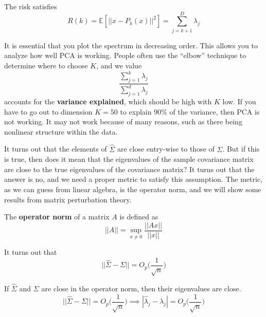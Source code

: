     \begin{theorem}[Risk]
      The risk satisfies 
      \begin{equation}
        R(k) = \mathbb{E}[|| x - P_k (x) ||^2 ] = \sum_{j=k+1}^D \lambda_j 
      \end{equation}
    \end{theorem}

    It is essential that you plot the spectrum in decreasing order. This allows you to analyze how well PCA is working. People often use the ``elbow'' technique to determine where to choose $K$, and we value 
    \begin{equation}
      \frac{\sum_{j=1}^k \lambda_j}{\sum_{j=1}^d \lambda_j} 
    \end{equation}
    accounts for the \textbf{variance explained}, which should be high with $K$ low. If you have to go out to dimension $K=50$ to explain $90\%$ of the variance, then PCA is not working. It may not work because of many reasons, such as there being nonlinear structure within the data. 

    It turns out that the elements of $\hat{\Sigma}$ are close entry-wise to those of $\Sigma$. But if this is true, then does it mean that the eigenvalues of the sample covariance matrix are close to the true eigenvalues of the covariance matrix? It turns out that the answer is no, and we need a proper metric to satisfy this assumption. The metric, as we can guess from linear algebra, is the operator norm, and we will show some results from matrix perturbation theory. 

    \begin{definition}
      The \textbf{operator norm} of a matrix $A$ is defined as 
      \begin{equation}
        ||A|| = \sup_{x \neq 0} \frac{||Ax||}{||x||} 
      \end{equation}
    \end{definition}

    \begin{lemma}[]
      It turns out that 
      \begin{equation}
        ||\hat{\Sigma} - \Sigma|| = O_p \bigg( \frac{1}{\sqrt{n}} \bigg)
      \end{equation}
    \end{lemma}

    \begin{theorem}
      If $\hat{\Sigma}$ and $\Sigma$ are close in the operator norm, then their eigenvalues are close. 
      \begin{equation}
        ||\hat{\Sigma} - \Sigma|| = O_p \bigg( \frac{1}{\sqrt{n}} \bigg) \implies |\hat{\lambda}_j - \lambda_j| = O_p \bigg( \frac{1}{\sqrt{n}} \bigg) 
      \end{equation}
    \end{theorem}

